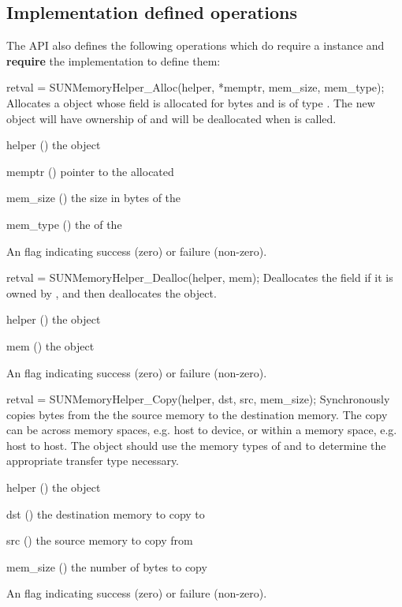 %
%
\subsection{Implementation defined operations}\label{ss:sunmemory_ops}

The  API also defines the following operations which do
require a  instance and \textbf{require} the implementation
to define them:

{
  retval = SUNMemoryHelper\_Alloc(helper, *memptr, mem\_size, mem\_type);
}
{
  Allocates a  object whose  field is allocated for
   bytes and is of type . The new object will
  have ownership of  and will be deallocated when
   is called.
}
{
  \begin{args}
  \item[helper] () the  object
  \item[memptr] () pointer to the allocated 
  \item[mem\_size] () the size in bytes of the 
  \item[mem\_type] () the  of the 
  \end{args}
}
{
  An  flag indicating success (zero) or failure (non-zero).
}
{}

{
  retval = SUNMemoryHelper\_Dealloc(helper, mem);
}
{
  Deallocates the  field if it is owned by , and then
  deallocates the  object.
}
{
  \begin{args}[helper]
  \item[helper] () the  object
  \item[mem] () the  object
  \end{args}
}
{
  An  flag indicating success (zero) or failure (non-zero).
}
{}

{
  retval = SUNMemoryHelper\_Copy(helper, dst, src, mem\_size);
}
{
  Synchronously copies  bytes from the the source memory to the
  destination memory.  The copy can be across memory spaces, e.g. host to
  device, or within a memory space, e.g. host to host.  The 
  object should use the memory types of  and  to determine
  the appropriate transfer type necessary.
}
{
  \begin{args}
  \item[helper] () the  object
  \item[dst] () the destination memory to copy to
  \item[src] () the source memory to copy from
  \item[mem\_size] () the number of bytes to copy
  \end{args}
}
{
  An  flag indicating success (zero) or failure (non-zero).
}
{}


